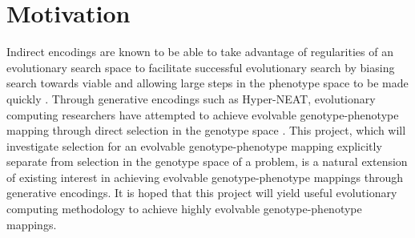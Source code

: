 \section{Motivation}

Indirect encodings are known to be able to take advantage of regularities of an evolutionary search space to facilitate successful evolutionary search by biasing search towards viable and allowing large steps in the phenotype space to be made quickly \cite{clune2009evolving}.
Through generative encodings such as Hyper-NEAT, evolutionary computing researchers have attempted to achieve evolvable genotype-phenotype mapping through direct selection in the genotype space \cite{mengistu2016evolvability}.
This project, which will investigate selection for an evolvable genotype-phenotype mapping explicitly separate from selection in the genotype space of a problem, is a natural extension of existing interest in achieving evolvable genotype-phenotype mappings through generative encodings.
It is hoped that this project will yield useful evolutionary computing methodology to achieve highly evolvable genotype-phenotype mappings.
